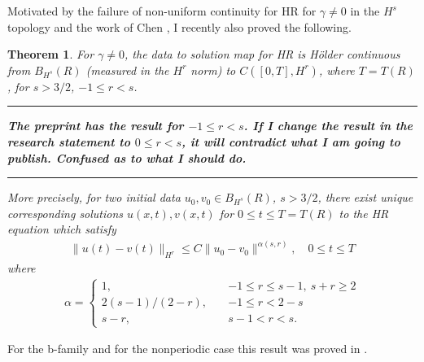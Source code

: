 \documentclass[12pt,reqno]{amsart}
\newtheorem{theorem}{Theorem}
\begin{document}
Motivated by the failure of non-uniform continuity for HR for $\gamma \neq 0$ in
the $H^{s}$ topology and the work of Chen \cite{Chen:2011fk}, I recently also proved the following.
%
%
\begin{theorem}
For $\gamma \neq 0$, the
data to solution map for HR is H\"older continuous from $B_{H^{s}}(R)$ (measured in the $H^{r}$ norm)
to $C([0, T], H^{r})$, where $T = T(R)$, for $s >
3/2$, $-1 \le r < s$. 
\hrule
\textbf{The preprint has the result for $-1 \le r < s$. If I change the result in the research statement to $0 \le r < s$, it will contradict
    what I am going to publish. Confused as to what I should do.}
\hrule
More precisely, for two initial data $u_{0}, v_{0} \in B_{H^{s}}(R)$, $s > 3/2$, there exist unique
corresponding solutions $u(x,t), v(x,t)$ for $0 \le t \le T= T(R)$ to the
HR equation which satisfy 
%
%
\begin{equation*}
\begin{split}
  \| u(t) - v(t) \|_{H^{r}} \le C \| u_{0} - v_{0} \|^{\alpha(s, r)},
  \quad 0
  \le t \le T
\end{split}
\end{equation*}
%
%
where  
%
%
\begin{equation*}
\begin{split}
\alpha = 
\begin{cases}
    1,  \quad  & -1 \le r \le s-1, \ s + r \ge 2  
  \\
  2(s-1)/(2-r), \quad  &  -1 \le r < 2-s 
  \\
  s-r, \quad  & s-1 < r < s. 
\end{cases}
\end{split}
\end{equation*}
\label{thm:main-thm}
\end{theorem}
For the b-family and for the nonperiodic case this result
was proved in \cite{Chen:2011fk}.
\end{document}
